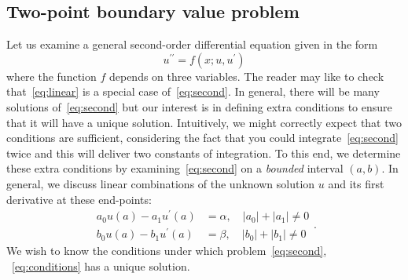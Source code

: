 \subsection{Two-point boundary value problem}


\begin{frame}[t]{\subsecname}
Let us examine a general second-order differential equation given in
the form
\begin{equation}\label{eq:second}
	u^{\prime\prime}=
	f\left(x;u,u^{\prime}\right)
\end{equation}
where the function $f$ depends on three variables. The reader may like
to check that~\eqref{eq:linear} is a special case of~\eqref{eq:second}.
In general, there will be many solutions of~\eqref{eq:second} but our
interest is in defining extra conditions to ensure that it will have a
unique solution. Intuitively, we might correctly expect that two
conditions are sufficient, considering the fact that you could
integrate~\eqref{eq:second} twice and this will deliver two constants
of integration. To this end, we determine these extra conditions by
examining~\eqref{eq:second} on a \emph{bounded} interval
$\left(a,b\right)$. In general, we discuss linear combinations of the
unknown solution $u$ and its first derivative at these end-points:
\begin{equation}\label{eq:conditions}
	\begin{split}
		a_{0}u\left(a\right)-a_{1}u^{\prime}\left(a\right)
		&=\alpha,\quad\left|a_{0}\right|+\left|a_{1}\right|\neq0\\
		b_{0}u\left(a\right)-b_{1}u^{\prime}\left(a\right)
		&=\beta,\quad\left|b_{0}\right|+\left|b_{1}\right|\neq0
	\end{split}.
\end{equation}
We wish to know the conditions under which problem~\eqref{eq:second},
~\eqref{eq:conditions} has a unique solution.
\end{frame}

